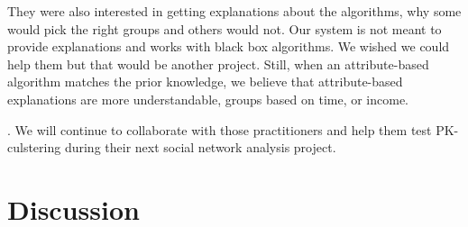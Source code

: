 They were also interested in getting explanations about the algorithms, why some would pick the right groups and others would not. Our system is not meant to provide explanations and works with black box algorithms. We wished we could help them but that would be another project. Still, when an attribute-based algorithm matches the prior knowledge, we believe that attribute-based explanations are more understandable, \eg groups based on time, or income.

.  We will continue to collaborate with those practitioners and help them test PK-culstering during their next social network analysis project.




\section{Discussion}

